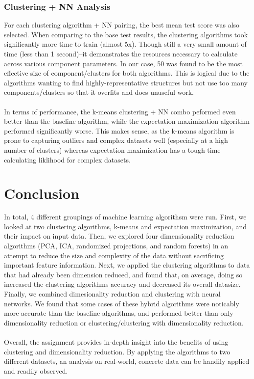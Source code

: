 \documentclass[h]{article}
\begin{document}
\subsubsection*{Clustering + NN Analysis}
For each clustering algorithm + NN pairing, the best mean test score was also 
selected.  When comparing to the base test results, the clustering algorithms 
took significantly more time to train (almost 5x).  Though still a very small 
amount of time (less than 1 second)--it demonstrates the resources necessary to 
calculate across various component parameters.  In our case, 50 was 
found to be the most effective size of component/clusters for both algorithms.  
This is logical due to the algorithms wanting to find highly-representative 
structures but not use too many components/clusters so that it overfits and does 
unuseful work.
\\ \\
In terms of performance, the k-means clustering + NN combo peformed even better 
than the baseline algorithm, while the expectation maximization algorithm 
performed significantly worse.  This makes sense, as the k-means algorithm is 
prone to capturing outliers and complex datasets well (especially at a high number of clusters) 
whereas expectation maximization has a tough time calculating liklihood for 
complex datasets.

\section*{Conclusion}  
In total, 4 different groupings of machine learning algorithsm were run.  First, 
we looked at two clustering algorithms, k-means and expectation maximization, and 
their impact on input data.  Then, we explored four dimensionality reduction 
algorithms (PCA, ICA, randomized projections, and random forests) in an attempt 
to reduce the size and complexity of the data without sacrificing important 
feature information.  Next, we applied the clustering algorithms to data that 
had already been dimension reduced, and found that, on average, doing so 
increased the clustering algorithms accuracy and decreased its overall datasize. 
Finally, we combined dimesionality reduction and clustering with neural 
networks.  We found that some cases of these hybrid algorithms were noticably 
more accurate than the baseline algorithms, and performed better than only 
dimensionality reduction or 
clustering/clustering with dimensionality reduction.
\\ \\
Overall, the assignment provides in-depth insight into the benefits of using clustering 
and dimensionality reduction.  By applying the algorithms to two different 
datasets, an analysis on real-world, concrete data can be handily applied and 
readily 
observed.
\end{document}

